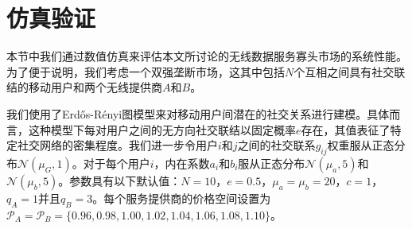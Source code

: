 \section{仿真验证}\label{sec:sim}

本节中我们通过数值仿真来评估本文所讨论的无线数据服务寡头市场的系统性能。为了便于说明，我们考虑一个双强垄断市场，这其中包括$N$个互相之间具有社交联结的移动用户和两个无线提供商$A$和$B$。

我们使用了Erd\H{o}s-R\'{e}nyi图模型来对移动用户间潜在的社交关系进行建模\cite{GongDCZ17}。具体而言，这种模型下每对用户之间的无方向社交联结以固定概率$e$存在，其值表征了特定社交网络的密集程度。我们进一步令用户$i$和$j$之间的社交联系$g_{ij}$权重服从正态分布$\mathcal{N}(\mu_G,1)$。对于每个用户$i$，内在系数$a_{i}$和$b_{i}$服从正态分布$\mathcal{N}(\mu_{a},5)$和$\mathcal{N}(\mu_{b},5)$。参数具有以下默认值：$N=10$，$e=0.5$，$\mu_{a}=\mu_{b}=20$，$c = 1$，$q_{A}=1$并且$q_{B}=3$。每个服务提供商的价格空间设置为$\mathcal{P}_A=\mathcal{P}_B=\{0.96,0.98,1.00,1.02,1.04,1.06,1.08,1.10\}$。

